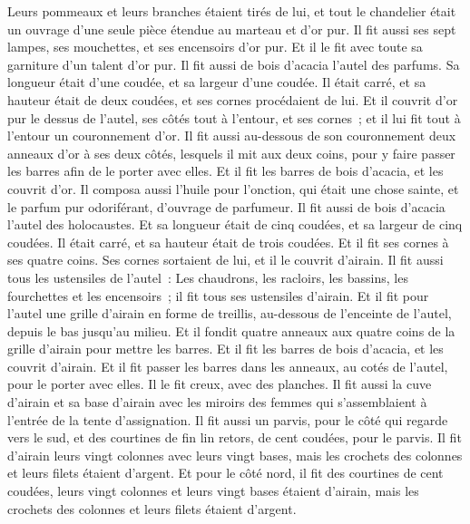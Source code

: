 \begin{multicols}{2}
Leurs pommeaux et leurs branches étaient tirés de lui, et tout le chandelier était un ouvrage d'une seule pièce étendue au marteau et d'or pur.
Il fit aussi ses sept lampes, ses mouchettes, et ses encensoirs d'or pur.
Et il le fit avec toute sa garniture d'un talent d'or pur.
Il fit aussi de bois d'acacia l'autel des parfums. Sa longueur était d'une coudée, et sa largeur d'une coudée. Il était carré, et sa hauteur était de deux coudées, et ses cornes procédaient de lui.
 Et il couvrit d'or pur le dessus de l'autel, ses côtés tout à l'entour, et ses cornes~; et il lui fit tout à l'entour un couronnement d'or.
Il fit aussi au-dessous de son couronnement deux anneaux d'or à ses deux côtés, lesquels il mit aux deux coins, pour y faire passer les barres afin de le porter avec elles.
Et il fit les barres de bois d'acacia, et les couvrit d'or.
Il composa aussi l'huile pour l'onction, qui était une chose sainte, et le parfum pur odoriférant, d'ouvrage de parfumeur.
\VerseOne{}Il fit aussi de bois d'acacia l'autel des holocaustes. Et sa longueur était de cinq coudées, et sa largeur de cinq coudées. Il était carré, et sa hauteur était de trois coudées.
Et il fit ses cornes à ses quatre coins. Ses cornes sortaient de lui, et il le couvrit d'airain.
Il fit aussi tous les ustensiles de l'autel~: Les chaudrons, les racloirs, les bassins, les fourchettes et les encensoirs~; il fit tous ses ustensiles d'airain.
Et il fit pour l'autel une grille d'airain en forme de treillis, au-dessous de l'enceinte de l'autel, depuis le bas jusqu'au milieu.
Et il fondit quatre anneaux aux quatre coins de la grille d'airain pour mettre les barres.
 Et il fit les barres de bois d'acacia, et les couvrit d'airain.
Et il fit passer les barres dans les anneaux, au cotés de l'autel, pour le porter avec elles. Il le fit creux, avec des planches.
Il fit aussi la cuve d'airain et sa base d'airain avec les miroirs des femmes qui s'assemblaient à l'entrée de la tente d'assignation.
Il fit aussi un parvis, pour le côté qui regarde vers le sud, et des courtines de fin lin retors, de cent coudées, pour le parvis.
Il fit d'airain leurs vingt colonnes avec leurs vingt bases, mais les crochets des colonnes et leurs filets étaient d'argent.
Et pour le côté nord, il fit des courtines de cent coudées, leurs vingt colonnes et leurs vingt bases étaient d'airain, mais les crochets des colonnes et leurs filets étaient d'argent.

\end{multicols}
